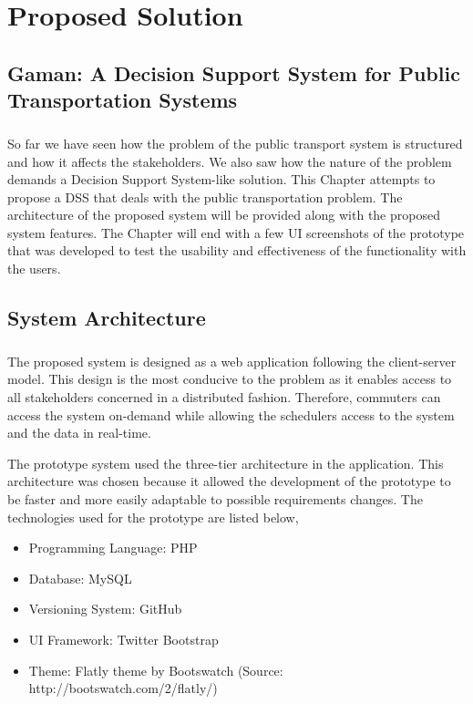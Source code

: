 
\chapter {Proposed Solution}
\label{chapter-ProposedSolution}

\section {Gaman: A Decision Support System for Public Transportation Systems}

\paragraph {} So far we have seen how the problem of the public transport system is structured and how it affects the stakeholders. We also saw how the nature of the problem demands a Decision Support System-like solution. This Chapter attempts to propose a DSS that deals with the public transportation problem. The architecture of the proposed system will be provided along with the proposed system features. The Chapter will end with a few UI screenshots of the prototype that was developed to test the usability and effectiveness of the functionality with the users.

\section{System Architecture}

\paragraph{ } The proposed system is designed as a web application following the client-server model. This design is the most conducive to the problem as it enables access to all stakeholders concerned in a distributed fashion. Therefore, commuters can access the system on-demand while allowing the schedulers access to the system and the data in real-time.

The prototype system used the three-tier architecture in the application. This architecture was chosen because it allowed the development of the prototype to be faster and more easily adaptable to possible requirements changes. The technologies used for the prototype are listed below,

\begin {itemize}
\item Programming Language: PHP
\item Database: MySQL
\item Versioning System: GitHub
\item UI Framework: Twitter Bootstrap
\item Theme: Flatly theme by Bootswatch (Source: http://bootswatch.com/2/flatly/)
\end {itemize}

